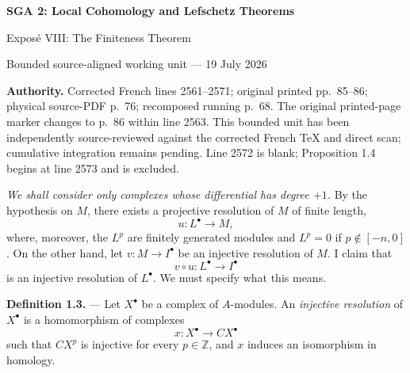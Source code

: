 \documentclass[10pt,a4paper]{article}
\begin{document}
\begin{center}
  {\Large\bfseries SGA 2: Local Cohomology and Lefschetz Theorems}\par\smallskip
  {\large Expos\'e VIII: The Finiteness Theorem}\par
  \small Bounded source-aligned working unit --- 19 July 2026
\end{center}
\noindent\colorbox{softgray}{\parbox{0.95\linewidth}{\footnotesize\textbf{Authority.}
Corrected French lines 2561--2571; original printed pp.~85--86; physical
source-PDF p.~76; recomposed running p.~68. The original printed-page marker
changes to p.~86 within line 2563. This bounded unit has been independently
source-reviewed against the corrected French TeX and direct scan; cumulative
integration remains pending. Line 2572 is blank; Proposition 1.4 begins at
line 2573 and is excluded.}}

\emph{We shall consider only complexes whose differential has degree $+1$.}
By the hypothesis on $M$, there exists a projective resolution of $M$ of
finite length,
\[
  u\colon L^\bullet\longrightarrow M,
\]
where, moreover, the $L^p$ are finitely generated modules and $L^p=0$ if
$p\notin[-n,0]$. On the other hand, let
$v\colon M\longrightarrow I^\bullet$ be an injective resolution of $M$. I
claim that
\begin{equation}
  v\circ u\colon L^\bullet\longrightarrow I^\bullet
  \tag{1.1}
\end{equation}
is an injective resolution of $L^\bullet$. We must specify what this means.

\medskip
\noindent\textbf{Definition 1.3.} --- Let $X^\bullet$ be a complex of
$A$-modules. An \emph{injective resolution} of $X^\bullet$ is a homomorphism
of complexes
\[
  x\colon X^\bullet\longrightarrow CX^\bullet
\]
such that $CX^p$ is injective for every $p\in\mathbb Z$, and $x$ induces an
isomorphism in homology.
\end{document}
